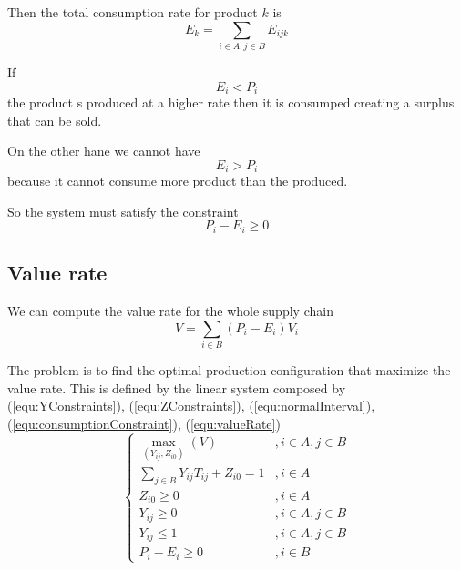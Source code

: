 \documentclass[a4paper,11pt]{article}
\begin{document}
Then the total consumption rate for product $ k $ is
	\[ E_{k} = \sum_{i \in A, j \in B} E_{ijk} \]

If
	\[ E_i < P_i \]
the product s produced at a higher rate then it is consumped creating a surplus that can be sold.

On the other hane we cannot have 
	\[ E_i > P_i \]
because it cannot consume more product than the produced.

So the system must satisfy the constraint
\begin{equation}
\label{equ:consumptionConstraint}
	P_i - E_i \ge 0
\end{equation}
	
\subsection{Value rate}
We can compute the value rate for the whole supply chain
\begin{equation}
\label{equ:valueRate}
	V = \sum_{i \in B}( P_i - E_i ) V_i
\end{equation}

The problem is to find the optimal production configuration that maximize the value rate. This is defined by the linear system composed by
(\ref{equ:YConstraints}),
(\ref{equ:ZConstraints}),
(\ref{equ:normalInterval}),
(\ref{equ:consumptionConstraint}),
(\ref{equ:valueRate})
\[
\left\{
\begin{array}{ll}
	\max_{(Y_{ij}, Z_{i0})} (V) & , i \in A, j \in B \\
	\sum_{j \in B} Y_{ij} T_{ij} + Z_{i0} = 1 & , i \in A \\
	Z_{i0} \ge 0 & , i \in A \\
	Y_{ij} \ge 0 & , i \in A, j \in B \\
	Y_{ij} \le 1 & , i \in A, j \in B \\
	P_i - E_i \ge 0 & , i \in B
\end{array}
\right.
\]
\end{document}
